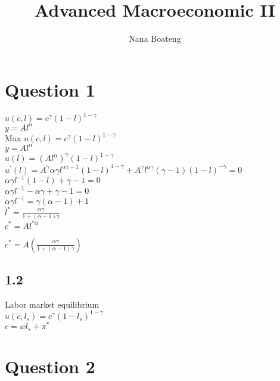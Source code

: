 \documentclass[11pt]{article}
\title{Advanced Macroeconomic II}
\author{Nana Boateng}
\date{}
\begin{document}
\maketitle
\section{Question 1}
$u(c,l)=c^{\gamma}(1-l)^{1-\gamma}$\\

$y=Al^{\alpha}$\\

Max $u(c,l)=c^{\gamma}(1-l)^{1-\gamma}$\\

$y=Al^{\alpha}$\\

$u(l)=(Al^{\alpha})^{\gamma}(1-l)^{1-\gamma}$\\


$u^{\prime}(l)=A^{\gamma}\alpha\gamma l^{\alpha\gamma-1}(1-l)^{1-\gamma}+A^{\gamma}l^{\alpha\gamma}(\gamma-1)(1-l)^{-\gamma}=0$\\

$\alpha\gamma l^{-1}(1-l)+\gamma-1=0$\\

$\alpha\gamma l^{-1}-\alpha \gamma+\gamma-1=0$\\

$\alpha\gamma l^{-1}=\gamma(\alpha-1)+1$\\

$l^{*}=\frac{\alpha\gamma}{1+(\alpha-1)\gamma}$\\

$c^{*}=Al^{*\alpha}$

$c^{*}=A\left( \frac{\alpha\gamma}{1+(\alpha-1)\gamma}\right)$


\subsection{1.2}
Labor market equilibrium\\

$u(c,l_{s})=c^{\gamma}(1-l_{s})^{1-\gamma}$\\

$c=wl_{s}+\pi^{*}$\\

\section{Question 2}
\end{document}
